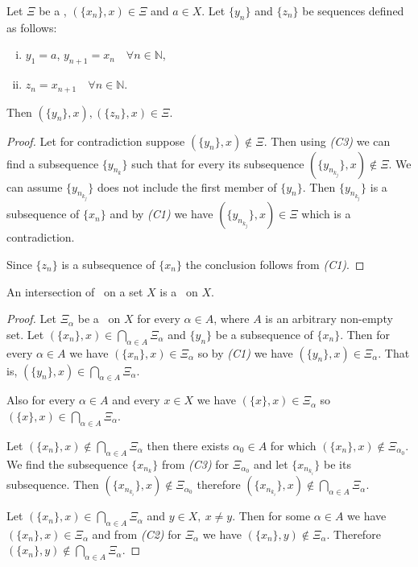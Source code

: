 \begin{theorem} \label{th:eqseq}
Let $\Xi$ be a \fcs, $(\{x_n\},x)\in\Xi$ and $a\in X$. Let $\{y_n\}$ and $\{z_n\}$ be sequences defined as follows:
\begin{enumerate}[(i)]
	\item $y_1=a$, $y_{n+1}=x_n\quad \forall n\in \mathbb{N}$,
	\item $z_n=x_{n+1}\quad \forall n\in \mathbb{N}$.
\end{enumerate}
Then $(\{y_n\},x), (\{z_n\},x)\in\Xi$.
\end{theorem} 
\begin{proof}
Let for contradiction suppose $(\{y_n\},x)\notin\Xi$. Then using \emph{(C3)} we can find a subsequence $\{y_{n_k}\}$ such that for every its subsequence $(\{y_{n_{k_j}}\},x)\notin\Xi$. We can assume $\{y_{n_{k_j}}\}$ does not include the first member of $\{y_n\}$. Then $\{y_{n_{k_j}}\}$ is a subsequence of $\{x_n\}$ and by \emph{(C1)} we have $(\{y_{n_{k_j}}\},x)\in\Xi$ which is a contradiction.

Since $\{z_n\}$ is a subsequence of $\{x_n\}$ the conclusion follows from \emph{(C1)}.
\end{proof}

\begin{theorem} \label{th:intxi}
An intersection of \fcss\ on a set $X$ is a \fcs\ on $X$.
\end{theorem} 
\begin{proof}
Let $\Xi_\alpha$ be a \fcs\ on $X$ for every $\alpha\in A$, where $A$ is an arbitrary non-empty set. Let $(\{x_n\},x)\in \bigcap_{\alpha\in A}\Xi_\alpha$ and $\{y_n\}$ be a subsequence of $\{x_n\}$. Then for every $\alpha\in A$ we have $(\{x_n\},x)\in \Xi_\alpha$ so by \emph{(C1)} we have $(\{y_n\},x)\in \Xi_\alpha$. That is, $(\{y_n\},x)\in \bigcap_{\alpha\in A}\Xi_\alpha$.

Also for every $\alpha\in A$ and every $x\in X$ we have $(\{x\},x)\in \Xi_\alpha$ so $(\{x\},x)\in \bigcap_{\alpha\in A}\Xi_\alpha$.

Let $(\{x_n\},x)\not\in \bigcap_{\alpha\in A}\Xi_\alpha$ then there exists $\alpha_0\in A$ for which $(\{x_n\},x)\not\in \Xi_{\alpha_0}$. We find the subsequence $\{x_{n_k}\}$ from \emph{(C3)} for $\Xi_{\alpha_0}$ and let $\{x_{n_{k_i}}\}$ be its subsequence. Then $(\{x_{n_{k_i}}\},x)\not\in\Xi_{\alpha_0}$ therefore $(\{x_{n_{k_i}}\},x)\not\in \bigcap_{\alpha\in A}\Xi_\alpha$.

Let $(\{x_n\},x)\in \bigcap_{\alpha\in A}\Xi_\alpha$ and $y\in X,\ x\ne y$. Then for some $\alpha\in A$ we have $(\{x_n\},x)\in \Xi_\alpha$ and from \emph{(C2)} for $\Xi_\alpha$ we have $(\{x_n\},y)\not\in \Xi_\alpha$. Therefore $(\{x_n\},y)\not\in \bigcap_{\alpha\in A}\Xi_\alpha$.
\end{proof}

